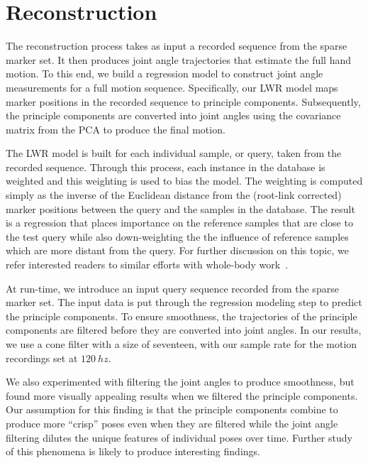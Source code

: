 
\section{Reconstruction}

The reconstruction process takes as input a recorded sequence from
 the sparse marker set.  It then produces joint angle trajectories
that estimate the full hand motion.  
To this end, we build a regression model 
to construct joint angle measurements for a full motion sequence.
Specifically, our LWR model maps marker positions in the recorded 
sequence to principle components.  Subsequently, the principle components 
are converted into joint angles using the covariance matrix
from the PCA to produce the final motion.

The LWR model is built for each individual sample, or query, taken from the
recorded sequence.  Through this process,
each instance in the database is weighted and this weighting is used
to bias the model.  The weighting is computed simply as the inverse
of the Euclidean distance from the (root-link corrected) marker positions 
between the query and the samples in the database.  The result
is a regression that places importance on the reference samples
that are close to the test query while also down-weighting the
the influence of reference samples which are more distant
from the query.  For further discussion on this topic, we
refer interested readers to similar efforts with whole-body work~\cite{}.

At run-time, we introduce an input query sequence
recorded from the sparse marker set. The input data is 
put through the regression modeling step to predict the principle components.
To ensure smoothness, the trajectories of the principle components
are filtered before they are converted into joint angles.  In our results, 
we use a cone filter with a size of seventeen, with our sample rate for
the motion recordings set at $120~hz$.  

We also experimented with
filtering the joint angles to produce smoothness, but found more visually 
appealing results when we filtered the principle components.  Our 
assumption for this finding is that the principle components combine
to produce more ``crisp'' poses even when they are filtered while
the joint angle filtering dilutes the unique features of individual
poses over time.  Further study of this phenomena is likely to 
produce interesting findings.







